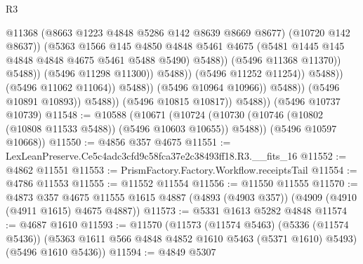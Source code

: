 \begin{lexlean}{R3}
\begin{coremodule}
                                                  @11368
                                                  (@8663 @1223 @4848 @5286 @142 @8639 @8669 @8677)
                                                  (@10720 @142 @8637))
                                                (@5363
                                                  @1566
                                                  @145
                                                  @4850
                                                  @4848
                                                  @5461
                                                  @4675
                                                  (@5481
                                                    @1445
                                                    @145
                                                    @4848
                                                    @4848
                                                    @4675
                                                    @5461
                                                    @5488
                                                    @5490)
                                                  @5488))
                                              (@5496 @11368 @11370))
                                            @5488))
                                        (@5496 @11298 @11300))
                                      @5488))
                                  (@5496 @11252 @11254))
                                @5488))
                            (@5496 @11062 @11064))
                          @5488))
                      (@5496 @10964 @10966))
                    @5488))
                (@5496 @10891 @10893))
              @5488))
          (@5496 @10815 @10817))
        @5488))
    (@5496 @10737 @10739)
@11548 := @10588
    (@10671
      (@10724 (@10730 (@10746 (@10802 (@10808 @11533 @5488)) (@5496 @10603 @10655)) @5488))
      (@5496 @10597 @10668))
@11550 := @4856 @357 @4675
@11551 := LexLeanPreserve.Ce5c4adc3cfd9c58fca37e2c38493ff18.R3.__fits_16
@11552 := @4862 @11551
@11553 := PrismFactory.Factory.Workflow.receiptsTail
@11554 := @4786 @11553
@11555 := @11552 @11554
@11556 := @11550 @11555
@11570 := @4873
    @357
    @4675
    @11555
    @1615
    @4887
    (@4893 (@4903 @357))
    (@4909 (@4910 (@4911 @1615) @4675 @4887))
@11573 := @5331 @1613 @5282 @4848
@11574 := @4687 @1610
@11593 := @11570
    (@11573
      (@11574 @5463)
      (@5336 (@11574 @5436))
      (@5363 @1611 @566 @4848 @4852 @1610 @5463 (@5371 @1610) @5493)
      (@5496 @1610 @5436))
@11594 := @4849 @5307

\end{coremodule}
\end{lexlean}
